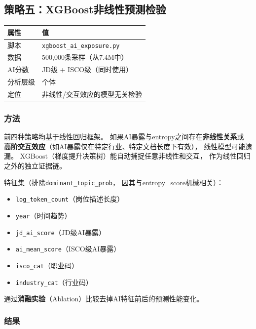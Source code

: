 \documentclass[12pt,a4paper]{ctexart}
\begin{document}
\subsection{策略五：XGBoost非线性预测检验}
\label{subsec:xgboost}

\begin{table}[h!]
\centering
\small
\begin{tabular}{ll}
\toprule
\textbf{属性} & \textbf{值} \\
\midrule
脚本 & \texttt{xgboost\_ai\_exposure.py} \\
数据 & 500,000条采样（从7.4M中） \\
AI分数 & JD级 + ISCO级（同时使用） \\
分析层级 & 个体 \\
定位 & 非线性/交互效应的模型无关检验 \\
\bottomrule
\end{tabular}
\end{table}

\subsubsection{方法}

前四种策略均基于线性回归框架。
如果AI暴露与entropy之间存在\textbf{非线性关系}或
\textbf{高阶交互效应}（如AI暴露仅在特定行业、特定文档长度下有效），
线性模型可能遗漏。
XGBoost（梯度提升决策树）能自动捕捉任意非线性和交互，
作为线性回归之外的独立证据链。

特征集（排除\texttt{dominant\_topic\_prob}，
因其与entropy\_score机械相关）：

\begin{itemize}
\item \texttt{log\_token\_count}（岗位描述长度）
\item \texttt{year}（时间趋势）
\item \texttt{jd\_ai\_score}（JD级AI暴露）
\item \texttt{ai\_mean\_score}（ISCO级AI暴露）
\item \texttt{isco\_cat}（职业码）
\item \texttt{industry\_cat}（行业码）
\end{itemize}

通过\textbf{消融实验}（Ablation）比较去掉AI特征前后的预测性能变化。

\subsubsection{结果}
\end{document}
